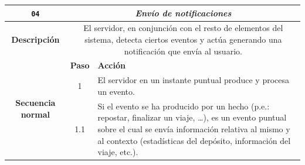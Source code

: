 \begin{table}[H]
  \centering
  \begin{tabularx}{\textwidth}{|c|c|X|}
    \hline
    \texttt{04}                                 & \multicolumn{2}{c|}{\textit{Envío de notificaciones}}                                                                                                                                                                                                                                                                                                                                                                                   \\
    \hline
    \textbf{Descripción}                        & \multicolumn{2}{X|}{El servidor, en conjunción con el resto de elementos del sistema, detecta ciertos eventos y actúa generando una notificación que envía al usuario.}                                                                                                                                                                                                                                                                 \\
    \hline
    \multirow{17}{*}{\textbf{Secuencia normal}} & \textbf{Paso}                                                                                                                                                           & \textbf{Acción}                                                                                                                                                                                                                                               \\
    \cline{2-3}
                                                & 1                                                                                                                                                                       & \multicolumn{1}{L|}{El servidor en un instante puntual produce y procesa un evento.}                                                                                                                                                                          \\
    \cline{2-3}
                                                & 1.1                                                                                                                                                                     & \multicolumn{1}{L|}{Si el evento se ha producido por un hecho (p.e.: repostar, finalizar un viaje, \dots), es un evento puntual sobre el cual se envía información relativa al mismo y al contexto (estadísticas del depósito, información del viaje, etc.).} \\

\end{tabularx}
\end{table}
